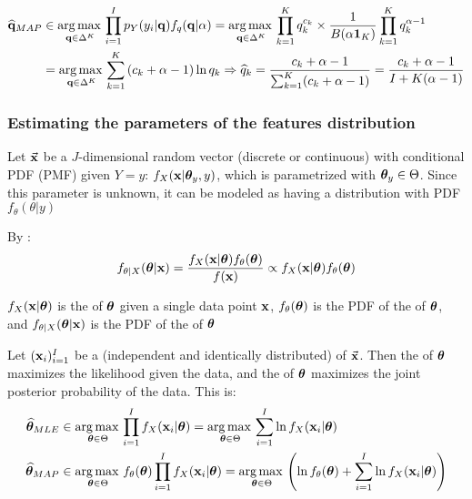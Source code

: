 \begin{align*}
    \widehat{\vb{q}}_{MAP} &\in\operatorname*{arg\,max\,}\limits_{\vb{q}\in\Delta^K}\prod_{i=1}^I p_Y(y_i|\vb{q})f_q(\vb{q}|\alpha)
    =\operatorname*{arg\,max\,}\limits_{\vb{q}\in\Delta^K} \prod_{k=1}^Kq_{k}^{c_k}\times \frac{1}{B(\alpha\vb{1}_K)}\prod_{k=1}^Kq_{k}^{\alpha-1} \\
    &=\operatorname*{arg\,max\,}\limits_{\vb{q}\in\Delta^K}\sum_{k=1}^K\left(c_k+\alpha-1\right)\ln q_{k} \Rightarrow \widehat{q}_k=\frac{c_k+\alpha-1}{\sum_{k=1}^K(c_k+\alpha-1)}=\frac{c_k+\alpha-1}{I+K(\alpha-1)}
\end{align*}




\subsubsection{Estimating the parameters of the features distribution}

Let $\va{x}$ be a $J$-dimensional random vector (discrete or continuous) with conditional PDF (PMF) given $Y=y$: $f_X(\vb{x}|\vb*{\theta}_y,y)$, which is parametrized with $\vb*{\theta}_y\in\Theta$. Since this parameter is unknown, it can be modeled as having a distribution with PDF $f_\theta(\theta|y)$\medskip

By :
\begin{equation*}
    f_{\theta|X}(\vb*{\theta}|\vb{x})=\frac{f_{X}(\vb{x}|\vb*{\theta})f_\theta(\vb*{\theta})}{f(\vb{x})}\propto f_{X}(\vb{x}|\vb*{\theta})f_\theta(\vb*{\theta})
\end{equation*}

$f_{X}(\vb{x}|\vb*{\theta})$ is the  of $\vb*{\theta}$ given a single data point $\vb{x}$, $f_\theta(\vb*{\theta})$ is the PDF of the  of $\vb*{\theta}$, and  $f_{\theta|X}(\vb*{\theta}|\vb{x})$ is the PDF of the  of $\vb*{\theta}$\medskip

Let $(\vb{x}_i)_{i=1}^I$ be a  (independent and identically distributed) of $\va{x}$. Then the  of $\vb*{\theta}$ maximizes the likelihood given the data, and the  of $\vb*{\theta}$ maximizes the joint posterior probability of the data. This is:
\begin{align*}
    \widehat{\vb*{\theta}}_{MLE} &\in\operatorname*{arg\,max\,}\limits_{\vb*{\theta}\in\Theta}\prod_{i=1}^I f_{X}(\vb{x}_i|\vb*{\theta}) = \operatorname*{arg\,max\,}\limits_{\vb*{\theta}\in\Theta}\sum_{i=1}^I\ln f_{X}(\vb{x}_i|\vb*{\theta})\\
    \widehat{\vb*{\theta}}_{MAP} &\in\operatorname*{arg\,max\,}\limits_{\vb*{\theta}\in\Theta}f_\theta(\vb*{\theta})
    \prod_{i=1}^I f_{X}(\vb{x}_i|\vb*{\theta}) = \operatorname*{arg\,max\,}\limits_{\vb*{\theta}\in\Theta}\left(\ln f_\theta(\vb*{\theta})+\sum_{i=1}^I\ln f_{X}(\vb{x}_i|\vb*{\theta})\right)
\end{align*}

